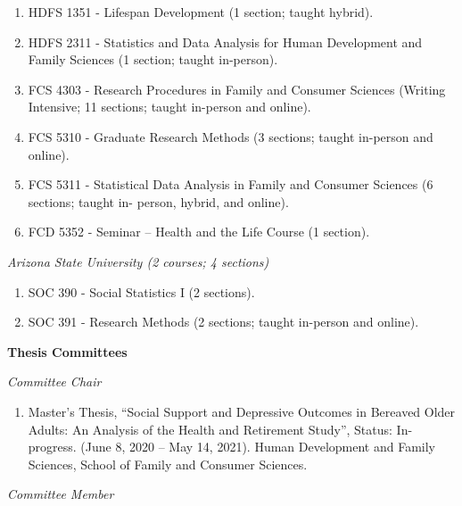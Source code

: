 \documentclass[
]{article}
\providecommand{\tightlist}{%
  \setlength{\itemsep}{0pt}\setlength{\parskip}{0pt}}
\begin{document}
\begin{enumerate}
\def\labelenumi{\arabic{enumi}.}
\item
  HDFS 1351 - Lifespan Development (1 section; taught hybrid).
\item
  HDFS 2311 - Statistics and Data Analysis for Human Development and
  Family Sciences (1 section; taught in-person).
\item
  FCS 4303 - Research Procedures in Family and Consumer Sciences
  (Writing Intensive; 11 sections; taught in-person and online).
\item
  FCS 5310 - Graduate Research Methods (3 sections; taught in-person and
  online).
\item
  FCS 5311 - Statistical Data Analysis in Family and Consumer Sciences
  (6 sections; taught in- person, hybrid, and online).
\item
  FCD 5352 - Seminar -- Health and the Life Course (1 section).
\end{enumerate}

\emph{Arizona State University (2 courses; 4 sections)}

\begin{enumerate}
\def\labelenumi{\arabic{enumi}.}
\item
  SOC 390 - Social Statistics I (2 sections).
\item
  SOC 391 - Research Methods (2 sections; taught in-person and online).
\end{enumerate}

\textbf{Thesis Committees}

\emph{Committee Chair}

\begin{enumerate}
\def\labelenumi{\arabic{enumi}.}
\tightlist
\item
  Master's Thesis, ``Social Support and Depressive Outcomes in Bereaved
  Older Adults: An Analysis of the Health and Retirement Study'',
  Status: In-progress. (June 8, 2020 -- May 14, 2021). Human Development
  and Family Sciences, School of Family and Consumer Sciences.
\end{enumerate}

\emph{Committee Member}
\end{document}

